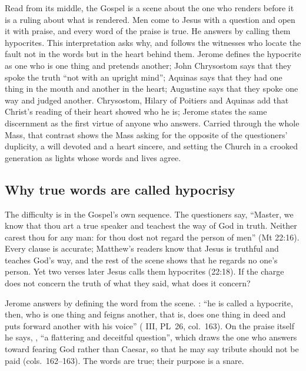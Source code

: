 \label{sec:sincere-heart}

Read from its middle, the Gospel is a scene about the one who renders before it
is a ruling about what is rendered. Men come to Jesus with a question and
open it with praise, and every word of the praise is true. He answers by
calling them hypocrites. This interpretation asks why, and follows the
witnesses who locate the fault not in the words but in the heart behind them.
Jerome defines the hypocrite as one who is one thing and pretends another; John Chrysostom says that they spoke the truth
``not with an upright mind''; Aquinas says that they had one thing in the
mouth and another in the heart; Augustine says that they spoke one way and
judged another. Chrysostom, Hilary of Poitiers and Aquinas add that Christ's
reading of their heart showed who he is; Jerome states the same discernment
as the first virtue of anyone who answers. Carried through the whole Mass,
that contrast shows the Mass asking for the opposite of the questioners'
duplicity, a will devoted and a heart sincere, and setting the Church in a
crooked generation as lights whose words and lives agree.

\subsection{Why true words are called hypocrisy}

The difficulty is in the Gospel's own sequence. The questioners say, ``Master,
we know that thou art a true speaker and teachest the way of God in truth.
Neither carest thou for any man: for thou dost not regard the person of men''
(Mt 22:16). Every clause is accurate; Matthew's readers know that Jesus is
truthful and teaches God's way, and the rest of the scene shows that he
regards no one's person. Yet two verses later Jesus calls them hypocrites
(22:18). If the charge does not concern the truth of what they said, what
does it concern?

Jerome answers by defining the word from the scene. : ``he is called a hypocrite, then, who is one thing and
feigns another, that is, does one thing in deed and puts forward another with
his voice'' ( III, PL~26, col.~163). On the
praise itself he says, , ``a
flattering and deceitful question'', which draws the one who answers toward
fearing God rather than Caesar, so that he may say tribute should not be paid
(cols.~162--163). The words are true; their purpose is a snare.

